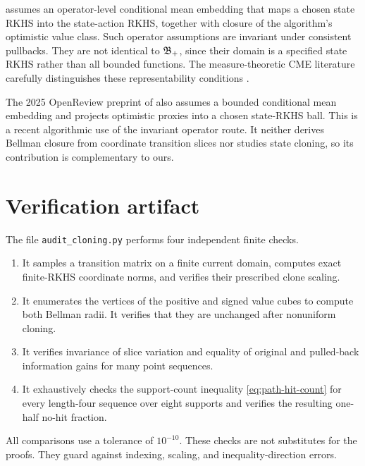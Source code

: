 \citet{chowdhury2023cme} assumes an operator-level conditional mean embedding that
maps a chosen state RKHS into the state-action RKHS, together with closure of the
algorithm's optimistic value class. Such operator assumptions are invariant under
consistent pullbacks. They are not identical to $\mathfrak B_{+}$, since their domain is a
specified state RKHS rather than all bounded functions. The measure-theoretic CME
literature carefully distinguishes these representability conditions
\citep{park2020measure,hertel2026regularity}.

The 2025 OpenReview preprint of \citet{kumar2025closure} also assumes a bounded
conditional mean embedding and projects optimistic proxies into a chosen state-RKHS
ball. This is a recent algorithmic use of the invariant operator route. It neither
derives Bellman closure from coordinate transition slices nor studies state cloning,
so its contribution is complementary to ours.

\section{Verification artifact}
\label{app:checks}

The file \texttt{audit\_cloning.py} performs four independent finite checks.
\begin{enumerate}[leftmargin=*,itemsep=2pt,topsep=2pt]
 \item It samples a transition matrix on a finite current domain, computes exact
 finite-RKHS coordinate norms, and verifies their prescribed clone scaling.
 \item It enumerates the vertices of the positive and signed value cubes to compute
 both Bellman radii. It verifies that they are unchanged after nonuniform cloning.
 \item It verifies invariance of slice variation and equality of original and
 pulled-back information gains for many point sequences.
 \item It exhaustively checks the support-count inequality
 \eqref{eq:path-hit-count} for every length-four sequence over eight supports and
 verifies the resulting one-half no-hit fraction.
\end{enumerate}
All comparisons use a tolerance of $10^{-10}$. These checks are not substitutes for
the proofs. They guard against indexing, scaling, and inequality-direction errors.
